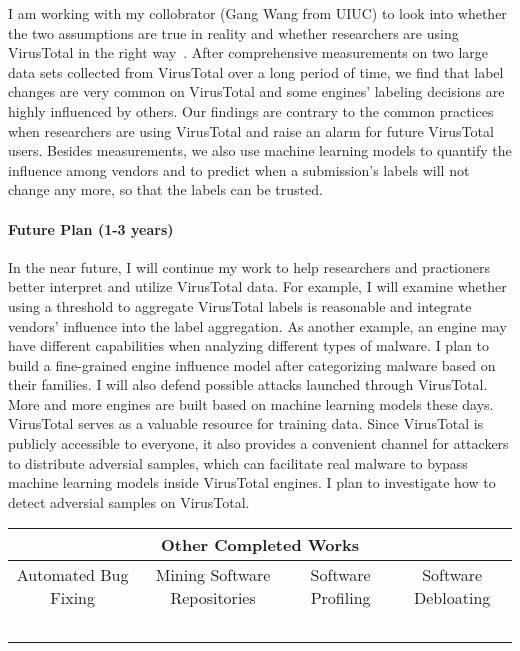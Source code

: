 \documentclass[10pt]{article}
\begin{document}
I am working with my collobrator (Gang Wang from UIUC) to look into 
whether the two assumptions are true in reality
and whether researchers are using VirusTotal in the right way~\cite{vt-jianjun,imc-peng}. 
After comprehensive measurements on two large data sets collected from VirusTotal
over a long period of time, 
we find that label changes are very common on VirusTotal and 
some engines' labeling decisions are highly influenced by others. 
Our findings are contrary to the common practices when researchers are using VirusTotal
and raise an alarm for future VirusTotal users. 
Besides measurements, we also use machine learning models to quantify the influence 
among vendors and to predict when a submission's labels will not change any more, 
so that the labels can be trusted. 

\vspace{-.1in}
\paragraph{Future Plan (1-3 years)}
In the near future, I will continue my work to help researchers and practioners 
better interpret and utilize VirusTotal data. 
For example, I will examine whether using a threshold to aggregate VirusTotal labels   
is reasonable and integrate vendors' influence into the label aggregation. 
As another example, an engine may have different capabilities when analyzing 
different types of malware. I plan to build a fine-grained 
engine influence model after categorizing malware based on their families. 
I will also defend possible attacks launched through VirusTotal. 
More and more engines are built based on machine learning models these days. 
VirusTotal serves as a valuable resource for training data.
Since VirusTotal is publicly accessible to everyone, it also provides 
a convenient channel for attackers to distribute adversial samples, 
which can facilitate real malware to bypass machine learning 
models inside VirusTotal engines.
I plan to investigate how to detect adversial samples on VirusTotal.  

\begin{table*}[th]
\centering
\begin{tabular}{|c|c|c|c|}
\hline
						\multicolumn{4}{|c|}{\textbf{Other Completed Works}}  \\ \hline
\multicolumn{1}{|c|}{Automated Bug Fixing}   & \multicolumn{1}{c|}{Mining Software Repositories} & \multicolumn{1}{c|}{Software Profiling} 		& \multicolumn{1}{c|}{Software Debloating} \\ \hline
 				~\cite{jin11afix}	   	    &              ~\cite{Gu15FSE}                                     &         ~\cite{icse-boqin}                              &  ~\cite{bangwen}~\cite{salad}        \\ \hline
\end{tabular}
\end{table*}
\end{document}
